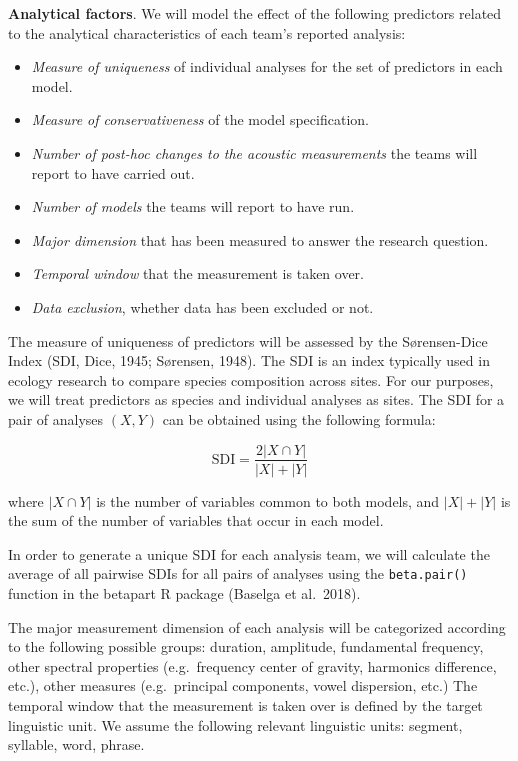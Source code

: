 \documentclass[
  english,
  man,floatsintext]{apa6}
\providecommand{\tightlist}{%
  \setlength{\itemsep}{0pt}\setlength{\parskip}{0pt}}
\begin{document}
\textbf{Analytical factors}. We will model the effect of the following predictors related to the analytical characteristics of each team's reported analysis:

\begin{itemize}
\tightlist
\item
  \emph{Measure of uniqueness} of individual analyses for the set of predictors in each model.
\item
  \emph{Measure of conservativeness} of the model specification.
\item
  \emph{Number of post-hoc changes to the acoustic measurements} the teams will report to have carried out.
\item
  \emph{Number of models} the teams will report to have run.
\item
  \emph{Major dimension} that has been measured to answer the research question.
\item
  \emph{Temporal window} that the measurement is taken over.
\item
  \emph{Data exclusion}, whether data has been excluded or not.
\end{itemize}

The measure of uniqueness of predictors will be assessed by the Sørensen-Dice Index (SDI, Dice, 1945; Sørensen, 1948).
The SDI is an index typically used in ecology research to compare species composition across sites.
For our purposes, we will treat predictors as species and individual analyses as sites.
The SDI for a pair of analyses \((X, Y)\) can be obtained using the following formula:

\[\text{SDI} = \frac{2|X \cap Y|}{|X|+|Y|}\]

where \(|X \cap Y|\) is the number of variables common to both models, and \(|X|+|Y|\) is the sum of the number of variables that occur in each model.

In order to generate a unique SDI for each analysis team, we will calculate the average of all pairwise SDIs for all pairs of analyses using the \texttt{beta.pair()} function in the betapart R package (Baselga et al.~2018).

The major measurement dimension of each analysis will be categorized according to the following possible groups: duration, amplitude, fundamental frequency, other spectral properties (e.g.~frequency center of gravity, harmonics difference, etc.), other measures (e.g.~principal components, vowel dispersion, etc.)
The temporal window that the measurement is taken over is defined by the target linguistic unit.
We assume the following relevant linguistic units: segment, syllable, word, phrase.
\end{document}
